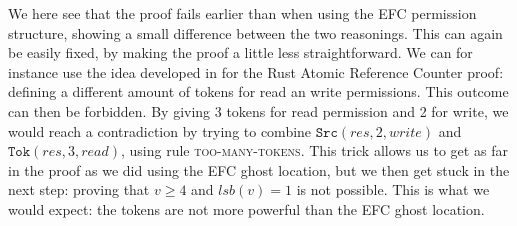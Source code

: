We here see that the proof fails earlier than when using the EFC permission structure, showing a small difference between the two reasonings. This can again be easily fixed, by making the proof a little less straightforward. We can for instance use the idea developed in \cite{pascal} for the Rust Atomic Reference Counter proof: defining a different amount of tokens for read an write permissions. This outcome can then be forbidden. By giving 3 tokens for read permission and 2 for write, we would reach a contradiction by trying to combine  $\texttt{Src}(res, 2, write)$ and $\texttt{Tok}(res, 3, read)$, using rule \textsc{too-many-tokens}. This trick allows us to get as far in the proof as we did using the EFC ghost location, but we then get stuck in the next step: proving that $v \geq 4$ and $lsb(v) = 1$ is not possible. This is what we would expect: the tokens are not more powerful than the EFC ghost location.
